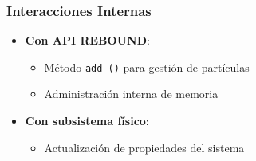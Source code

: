 \subsubsection{Interacciones Internas}
\begin{itemize}
    \item \textbf{Con API REBOUND}:
    \begin{itemize}
        \item Método \texttt{add~()} para gestión de partículas
        \item Administración interna de memoria
    \end{itemize}
    \item \textbf{Con subsistema físico}:
    \begin{itemize}
        \item Actualización de propiedades del sistema
    \end{itemize}
\end{itemize}

\newpage
